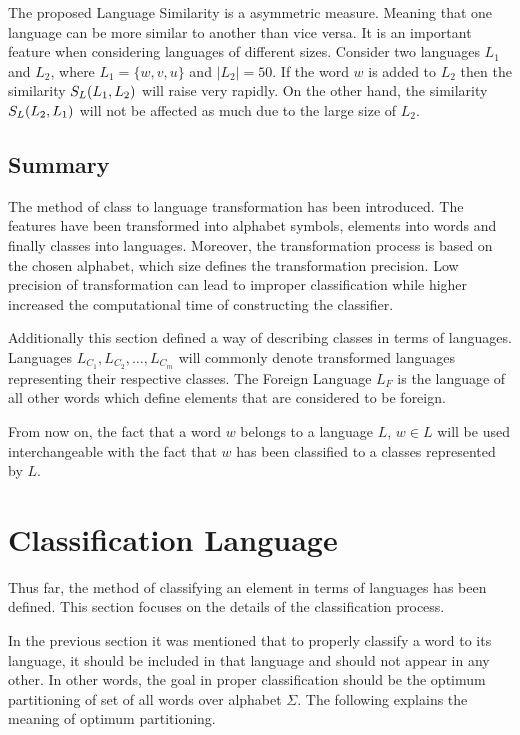 \documentclass{mini}
\begin{document}
The proposed Language Similarity is a asymmetric measure. Meaning that one language can be more similar to another than vice versa. It is an important feature when considering languages of different sizes. Consider two languages $L_{1}$ and $L_{2}$, where $L_{1} = \{w,v,u\}$ and $|L_{2}| = 50$.
If the word $w$ is added to $L_{2}$ then the similarity $S_{L}(L_1,L_2)$ will raise very rapidly. On the other hand, the similarity $S_{L}(L_2,L_1)$ will not be affected as much due to the large size of $L_{2}$.

\subsection{Summary}\label{sec:lan_theory_transf_summary}
The method of class to language transformation has been introduced. The features have been transformed into alphabet symbols, elements into words and finally classes into languages. Moreover, the transformation process is based on the chosen alphabet, which size defines the transformation precision. Low precision of transformation can lead to improper classification while higher increased the computational time of constructing the classifier.

Additionally this section defined a way of describing classes in terms of languages. Languages $L_{C_1},L_{C_2},\ldots,L_{C_m}$ will commonly denote transformed languages representing their respective classes. The Foreign Language $L_{F}$ is the language of all other words which define elements that are considered to be foreign.

From now on, the fact that a word $w$ belongs to a language $L$, $w\in L$ will be used interchangeable with the fact that $w$ has been classified to a classes represented by $L$.

\section{Classification Language}\label{sec:lan_theory_class_lan}
Thus far, the method of classifying an element in terms of languages has been defined. This section focuses on the details of the classification process.

In the previous section it was mentioned that to properly classify a word to its language, it should be included in that language and should not appear in any other. In other words, the goal in proper classification should be the optimum partitioning of set of all words over alphabet $\Sigma$. The following explains the meaning of optimum partitioning.
\end{document}
